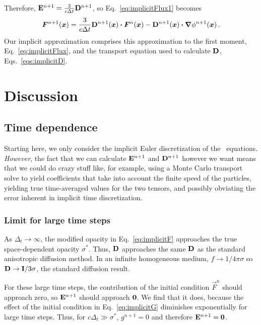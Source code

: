 Therefore, $\mathbf{E}^{n+1} =  \frac{3}{c \Delta t} \mathbf{D}^{n+1}$, so
Eq.~\eqref{eq:implicitFlux1} becomes
\begin{equation}\label{eq:implicitFlux}
  \bm{F}^{n+1}(\bm{x}) =  \frac{3}{c \Delta t} \mathbf{D}^{n+1} (\bm{x}) \bm{\cdot}
  \bm{F}^n(\bm{x})
  - \mathbf{D}^{n+1}(\bm{x}) \bm{\cdot} \bm{\nabla} \phi^{n+1} (\bm{x}) \,.
\end{equation}
Our implicit approximation comprises this approximation to the first moment,
Eq.~\eqref{eq:implicitFlux}, and the transport equation used to calculate
$\mathbf{D}$, Eqs.~\eqref{eqs:implicitD}.

\section{Discussion}

\subsection{Time dependence}
Starting here, we only consider the implicit Euler discretization of the
\APone\ equations. \emph{However}, the fact that we can calculate
$\mathbf{E}^{n+1}$ and $\mathbf{D}^{n+1}$ however we want means that we could do crazy
stuff like, for example, using a Monte Carlo transport solve to yield
coefficients that take into account the finite speed of the particles, yielding
true time-averaged values for the two tensors, and possibly obviating the error
inherent in implicit time discretization.

\subsubsection{Limit for large time steps}
As $\Delta_t\to \infty$, the modified opacity in Eq.~\eqref{eq:implicitF}
approaches the true space-dependent opacity $\sigma^\ast$. Thus, $\mathbf{D}$
approaches the same $\mathbf{D}$ as the standard anisotropic diffusion method. In
an infinite homogeneous medium, $f\to 1/4\pi \sigma$ so $\mathbf{D} \to
\mathbf{I}/3\sigma$, the standard diffusion result.

For these large time steps, the contribution of the initial condition
$\vec{F}^n$ should approach zero, so $\mathbf{E}^{n+1}$ should approach $
\mathbf{0}$. We find that it does, because the effect of the initial condition
in Eq.~\eqref{eq:implicitG} diminishes exponentially for large time steps. Thus,
for $c \Delta_t \gg \sigma^\ast$, $g^{n+1}=0$ and therefore
$\mathbf{E}^{n+1}=\mathbf{0}$.

